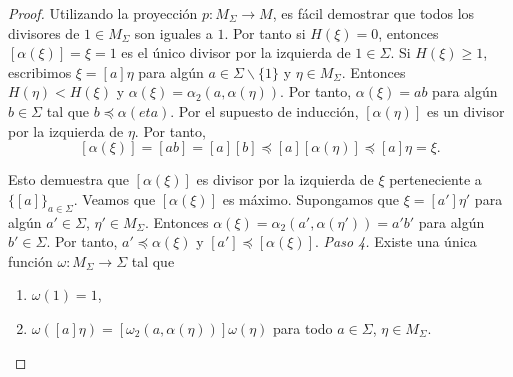\documentclass[12pt]{book}
\theoremstyle{definition}
\begin{document}
\begin{proof}
Utilizando la proyección $p:M_\Sigma\rightarrow M$, es fácil demostrar que todos los divisores de $1\in M_\Sigma$ son iguales a $1$. Por tanto si $H(\xi)=0$, entonces $[\alpha(\xi)]=\xi=1$ es el único divisor por la izquierda de $1\in\Sigma$. Si $H(\xi)\geq 1$, escribimos $\xi=[a]\eta$ para algún $a\in\Sigma \backslash \{1\}$ y $\eta\in M_\Sigma$. Entonces $H(\eta)< H(\xi)$ y $\alpha(\xi)=\alpha_2(a,\alpha(\eta))$. Por tanto, $\alpha(\xi)=ab$ para algún $b\in\Sigma$ tal que $b\preceq \alpha(eta)$. Por el supuesto de inducción, $[\alpha(\eta)]$ es un divisor por la izquierda de $\eta$. Por tanto,
$$[\alpha(\xi)]=[ab]=[a][b]\preceq [a][\alpha(\eta)]\preceq [a]\eta=\xi.$$

Esto demuestra que $[\alpha(\xi)]$ es divisor por la izquierda  de $\xi$ perteneciente a $\{[a]\}_{a\in\Sigma}$. Veamos que $[\alpha(\xi)]$ es máximo. Supongamos que $\xi=[a']\eta'$
para algún $a'\in\Sigma$, $\eta'\in M_\Sigma$. Entonces $\alpha(\xi) =\alpha_2(a',\alpha(\eta'))=a'b'$ para algún $b'\in\Sigma$. Por tanto, $a'\preceq \alpha(\xi)$ y $[a']\preceq [\alpha(\xi)]$.
\newline
\newline
\textit{Paso 4.} Existe una única función $\omega:M_\Sigma\rightarrow\Sigma$ tal que

\begin{enumerate}[label=\roman*.]
\item $\omega(1)=1$,
\item $\omega([a]\eta)=[\omega_2(a,\alpha(\eta))]\omega(\eta)$ para todo $a\in\Sigma$, $\eta\in M_\Sigma$.
\end{enumerate}


\end{proof}
\end{document}
